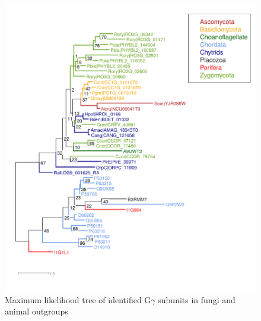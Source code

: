 \begin{figure}[hb]
  \centering
  \includegraphics{./Chapter_RhodAux/img/Ggamma_tree.png}
  \caption[Gbeta tree]{Maximum likelihood tree of identified G$\gamma$ subunits in fungi and animal outgroups}
  \label{fig:ChRhodA_GgammaTree}
\end{figure}
